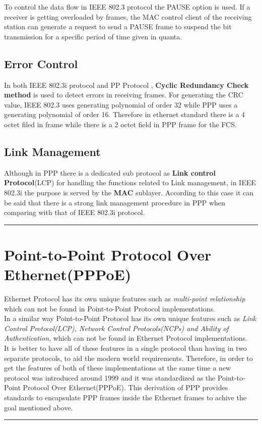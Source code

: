 \documentclass[a4paper,11pt]{article}%
\begin{document}
To control the data flow in IEEE 802.3 protocol the PAUSE option is used. If a receiver is getting overloaded by frames, the MAC control client of the receiving station can generate a request to send a PAUSE frame to suspend the bit transmission for a specific period of time given in quanta. 

\subsection{Error Control}

In both IEEE 802.3i protocol and PP Protocol , \textbf{Cyclic Redundancy Check method} is used to detect errors in receiving frames. For generating the CRC value, IEEE 802.3 uses generating polynomial of order 32 while PPP uses a generating polynomial of order 16. Therefore in ethernet standard there is a 4 octet filed in frame while there is a 2 octet field in PPP frame for the FCS.

\subsection{Link Management}

Although in PPP there is a dedicated sub protocol as \textbf{Link control Protocol}(LCP) for handling the functions related to Link management, in IEEE 802.3i the purpose is served by the \textbf{MAC} sublayer. According to this case it can be said that there is a strong link management procedure in PPP when comparing with that of IEEE 802.3i protocol.\\[3cm]

\hrule
\section{Point-to-Point Protocol Over Ethernet(PPPoE)}

Ethernet Protocol has its own unique features such as \textit{multi-point relationship} which can not be found in Point-to-Point Protocol implementations. \\

In a similar way Point-to-Point Protocol has its own unique features such as \textit{Link Control Protocol(LCP), Network Control Protocols(NCPs) and Ability of Authentication},  which can not be found in Ethernet Protocol implementations.\\


It is better to have all of these  features in a single protocol than having in two separate protocols, to aid the modern world requirements. Therefore, in order to get the features of both of these implementations at the same time a new protocol was introduced around 1999 and it was standardized as the Point-to-Point Protocol Over Ethernet(PPPoE)\cite{pppoe}. This  derivation of PPP provides standards to encapsulate PPP frames inside the Ethernet frames to achive the goal mentioned above.\\[3cm] 




\hrule



\end{document}
